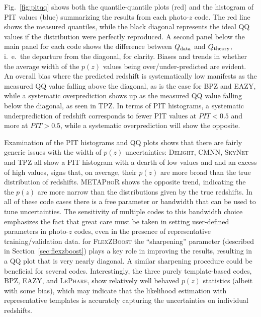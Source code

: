 Fig.~\ref{fig:pitqq} shows both the quantile-quantile plots (red) and the histogram of PIT values (blue) summarizing the results from each photo-$z$ code.  The red line shows the measured quantiles, while the black diagonal represents the ideal QQ values if the distribution were perfectly reproduced.  A second panel below the main panel for each code shows the difference between $Q_{\rm data}$ and $Q_{\rm theory}$, i.~e.~the departure from the diagonal, for clarity.
Biases and trends in whether the average width of the $p(z)$ values being over/under-predicted are evident.  An overall bias where the predicted redshift is systematically low manifests as the measured QQ value falling above the diagonal, as is the case for \textsc{BPZ} and \textsc{EAZY}, while a systematic overprediction shows up as the measured QQ value falling below the diagonal, as seen in \textsc{TPZ}.  In terms of PIT histograms, a systematic underprediction of redshift corresponds to fewer PIT values at $PIT<0.5$ and more at $PIT>0.5$, while a systematic overprediction will show the opposite.

Examination of the PIT histograms and QQ plots shows that there are fairly generic issues with the width of $p(z)$ uncertainties: \textsc{Delight, CMNN, SkyNet} and \textsc{TPZ} all show a PIT histogram with a dearth of low values and and an excess of high values, signs that, on average, their $p(z)$ are more broad than the true distribution of redshifts.  \textsc{METAPhoR} shows the opposite trend, indicating the the $p(z)$  are more narrow than the distributions given by the true redshifts.  In all of these code cases there is a free parameter or bandwidth that can be used to tune uncertainties.  The sensitivity of multiple codes to this bandwidth choice emphasizes the fact that great care must be taken in setting user-defined parameters in photo-$z$ codes, even in the presence of representative training/validation data.  for \textsc{FlexZBoost} the ``sharpening'' parameter (described in Section~\ref{sec:flexzboost}) plays a key role in improving the results, resulting in a QQ plot that is very nearly diagonal.  A similar sharpening procedure could be beneficial for several codes.
Interestingly, the three purely template-based codes, \textsc{BPZ, EAZY}, and \textsc{LePhare}, show relatively well behaved $p(z)$ statistics (albeit with some bias), which may indicate that the likelihood estimation with representative templates is accurately capturing the uncertainties on individual redshifts.

